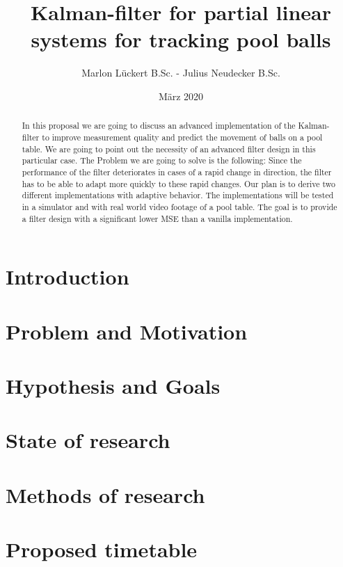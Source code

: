 \documentclass[titlepage, a4paper, 11pt]{scrartcl}
\begin{document}
\title{Kalman-filter for partial linear systems for tracking pool balls}
\author{Marlon Lückert B.Sc. - Julius Neudecker B.Sc.}
\date{März 2020}
\maketitle

\tableofcontents

\begin{abstract}
    In this proposal we are going to discuss an advanced implementation of the Kalman-filter \cite{kalman} to improve measurement quality and predict the movement of balls on a pool table. 
    We are going to point out the necessity of an advanced filter design in this particular case. The Problem we are going to solve is the following:
    Since the performance of the filter deteriorates in cases of a rapid change in direction, the filter has to be able to adapt more quickly to these rapid changes.
    Our plan is to derive two different implementations with adaptive behavior. The implementations will be tested in a simulator and with real world video footage of a pool table.
    The goal is to provide a filter design with a significant lower MSE than a vanilla implementation.
\end{abstract}


\begin{multicols}{2}
    \section{Introduction}

    \section{Problem and Motivation}

    \section{Hypothesis and Goals}

    \section{State of research}

    \section{Methods of research}

    \section{Proposed timetable}

\end{multicols} 

 

\end{document}
